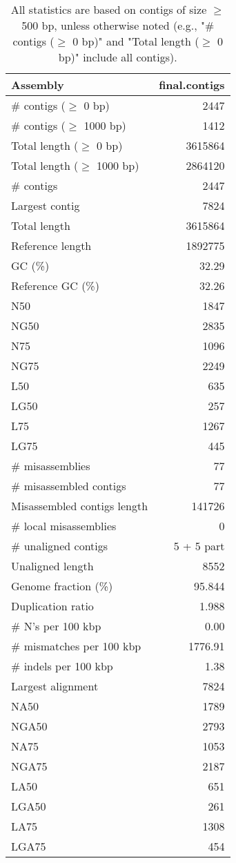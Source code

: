 \documentclass[12pt,a4paper]{article}
\begin{document}
\begin{table}[ht]
\begin{center}
\caption{All statistics are based on contigs of size $\geq$ 500 bp, unless otherwise noted (e.g., "\# contigs ($\geq$ 0 bp)" and "Total length ($\geq$ 0 bp)" include all contigs).}
\begin{tabular}{|l*{1}{|r}|}
\hline
Assembly & final.contigs \\ \hline
\# contigs ($\geq$ 0 bp) & 2447 \\ \hline
\# contigs ($\geq$ 1000 bp) & 1412 \\ \hline
Total length ($\geq$ 0 bp) & 3615864 \\ \hline
Total length ($\geq$ 1000 bp) & 2864120 \\ \hline
\# contigs & 2447 \\ \hline
Largest contig & 7824 \\ \hline
Total length & 3615864 \\ \hline
Reference length & 1892775 \\ \hline
GC (\%) & 32.29 \\ \hline
Reference GC (\%) & 32.26 \\ \hline
N50 & 1847 \\ \hline
NG50 & 2835 \\ \hline
N75 & 1096 \\ \hline
NG75 & 2249 \\ \hline
L50 & 635 \\ \hline
LG50 & 257 \\ \hline
L75 & 1267 \\ \hline
LG75 & 445 \\ \hline
\# misassemblies & 77 \\ \hline
\# misassembled contigs & 77 \\ \hline
Misassembled contigs length & 141726 \\ \hline
\# local misassemblies & 0 \\ \hline
\# unaligned contigs & 5 + 5 part \\ \hline
Unaligned length & 8552 \\ \hline
Genome fraction (\%) & 95.844 \\ \hline
Duplication ratio & 1.988 \\ \hline
\# N's per 100 kbp & 0.00 \\ \hline
\# mismatches per 100 kbp & 1776.91 \\ \hline
\# indels per 100 kbp & 1.38 \\ \hline
Largest alignment & 7824 \\ \hline
NA50 & 1789 \\ \hline
NGA50 & 2793 \\ \hline
NA75 & 1053 \\ \hline
NGA75 & 2187 \\ \hline
LA50 & 651 \\ \hline
LGA50 & 261 \\ \hline
LA75 & 1308 \\ \hline
LGA75 & 454 \\ \hline
\end{tabular}
\end{center}
\end{table}
\end{document}
